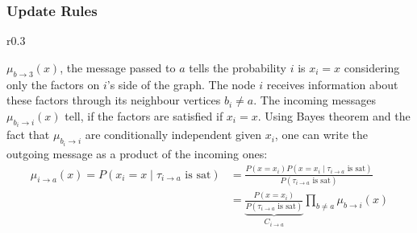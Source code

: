 \subsubsection{Update Rules}


\begin{wrapfigure}{r}{0.3\textwidth}

\end{wrapfigure}
$\mu_{b \rightarrow 3}(x)$, the message passed to $a$ tells the probability $i$ is $x_i = x$ considering only the factors on $i$'s side of the graph. \newline The node $i$ receives information about these factors through its neighbour vertices $b_i \neq a$. The incoming messages $\mu_{b_i \rightarrow i}(x)$ tell, if the factors are satisfied if $x_i = x$. \newline
Using Bayes theorem and the fact that $\mu_{b_i \rightarrow i}$ are conditionally independent given $x_i$, one can write the outgoing message  as a product of the incoming ones:
\begin{align*}
\mu_{i\rightarrow a}(x) = P(x_i = x \; | \; \tau_{i \rightarrow a} \text{ is sat})
&= \frac{P(x = x_i) P(x = x_i \; | \; \tau_{i \rightarrow a} \text{ is sat})}{P(\tau_{i \rightarrow a} \text{ is sat})} \\
&= \underbrace{\frac{P(x = x_i)}{P(\tau_{i \rightarrow a}\text{ is sat})}}_{C_{i \rightarrow a}} \prod_{b \neq a} \mu_{b \rightarrow i}(x) \\
\end{align*}

